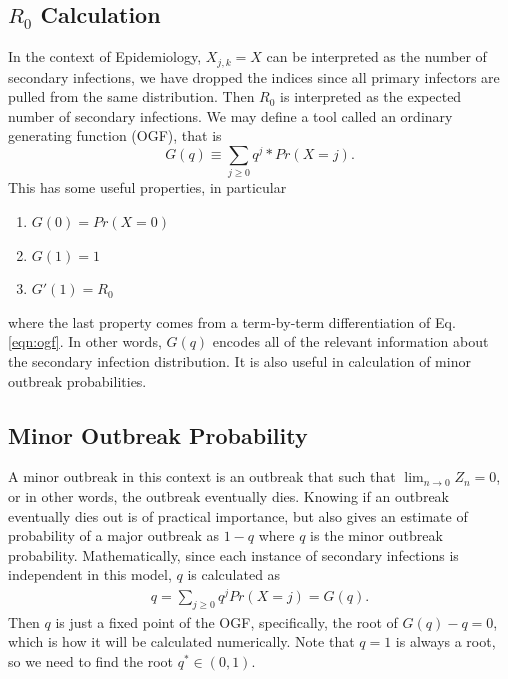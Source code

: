 \documentclass[11pt, twocolumn]{article}
\begin{document}
\subsection*{$R_0$ Calculation}
In the context of Epidemiology, $X_{j,k} = X$ can be interpreted as the number of secondary infections, we have dropped the indices since all primary infectors are pulled from the same distribution. Then $R_0$ is interpreted as the expected number of secondary infections. We may define a tool called an ordinary generating function (OGF), that is
\begin{equation*}
	G(q)\equiv\sum_{j\geq 0}q^j * Pr(X=j).
	\label{eqn:ogf}
\end{equation*}
This has some useful properties, in particular
\begin{enumerate}
	\item $G(0)=Pr(X=0)$
	\item $G(1)=1$
	\item $G'(1)=R_0$
\end{enumerate}
where the last property comes from a term-by-term differentiation of Eq. \ref{eqn:ogf}. In other words, $G(q)$ encodes all of the relevant information about the secondary infection distribution. It is also useful in calculation of minor outbreak probabilities.
\subsection*{Minor Outbreak Probability}
A minor outbreak in this context is an outbreak that such that $\lim_{n\rightarrow 0}Z_n=0$, or in other words, the outbreak eventually dies. Knowing if an outbreak eventually dies out is of practical importance, but also gives an estimate of probability of a major outbreak as $1-q$ where $q$ is the minor outbreak probability. Mathematically, since each instance of secondary infections is independent in this model, $q$ is calculated as
\begin{align}
	q = \sum_{j\geq 0}q^jPr(X=j) = G(q).
\end{align}
Then $q$ is just a fixed point of the OGF, specifically, the root of $G(q)-q=0$, which is how it will be calculated numerically. Note that $q=1$ is always a root, so we need to find the root $q^*\in (0, 1)$.
\end{document}
